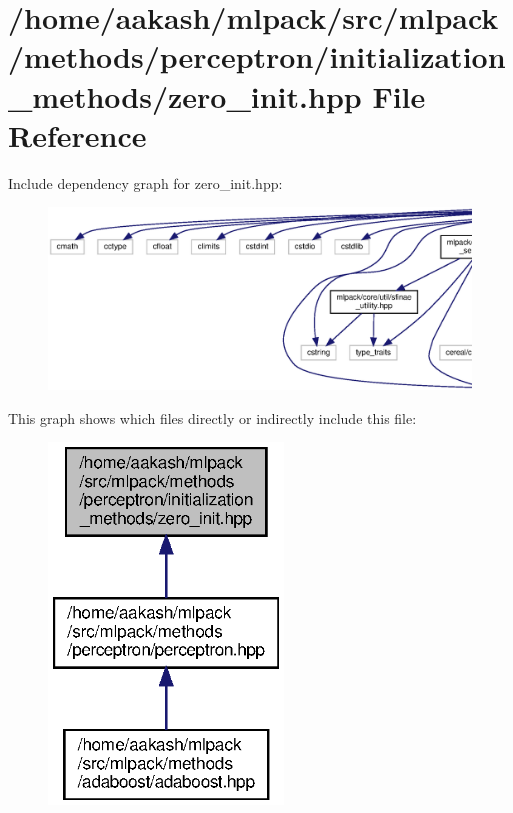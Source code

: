 \section{/home/aakash/mlpack/src/mlpack/methods/perceptron/initialization\+\_\+methods/zero\+\_\+init.hpp File Reference}
\label{zero__init_8hpp}
Include dependency graph for zero\+\_\+init.\+hpp\+:
\nopagebreak
\begin{figure}[H]
\begin{center}
\leavevmode
\includegraphics[width=350pt]{zero__init_8hpp__incl}
\end{center}
\end{figure}
This graph shows which files directly or indirectly include this file\+:
\nopagebreak
\begin{figure}[H]
\begin{center}
\leavevmode
\includegraphics[width=177pt]{zero__init_8hpp__dep__incl}
\end{center}
\end{figure}
